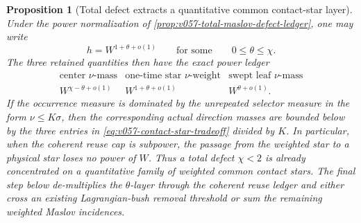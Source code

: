 \documentclass[10pt]{article}
\newtheorem{proposition}[theorem]{Proposition}
\begin{document}
\begin{proposition}[Total defect extracts a quantitative common contact-star layer]
Under the power normalization of
\cref{prop:v057-total-maslov-defect-ledger}, one may write
\begin{equation}
\label{eq:v057-contact-star-tradeoff-parameter}
h=W^{1+\theta+o(1)}
\qquad\text{for some}\qquad
0\le\theta\le\chi.
\end{equation}
The three retained quantities then have the exact power ledger
\begin{equation}
\label{eq:v057-contact-star-tradeoff}
\boxed{
\begin{array}{c|c|c}
\text{center \(\nu\)-mass}&
\text{one-time star \(\nu\)-weight}&
\text{swept leaf \(\nu\)-mass}\\ \hline
W^{\chi-\theta+o(1)}&
W^{1+\theta+o(1)}&
W^{\theta+o(1)}.
\end{array}
}
\end{equation}
If the occurrence measure is dominated by the unrepeated selector measure in the form
\(\nu\le K\sigma\), then the corresponding actual direction masses are bounded below by the three
entries in \eqref{eq:v057-contact-star-tradeoff} divided by \(K\).  In particular, when the
coherent reuse cap is subpower, the passage from the weighted star to a physical star loses no
power of \(W\).
Thus a total defect \(\chi<2\) is already concentrated on a quantitative family of weighted common
contact stars.  The final step below de-multiplies the \(\theta\)-layer through the coherent reuse ledger and either cross an existing Lagrangian-bush
removal threshold or sum the remaining weighted Maslov incidences.
\end{proposition}
\end{document}
